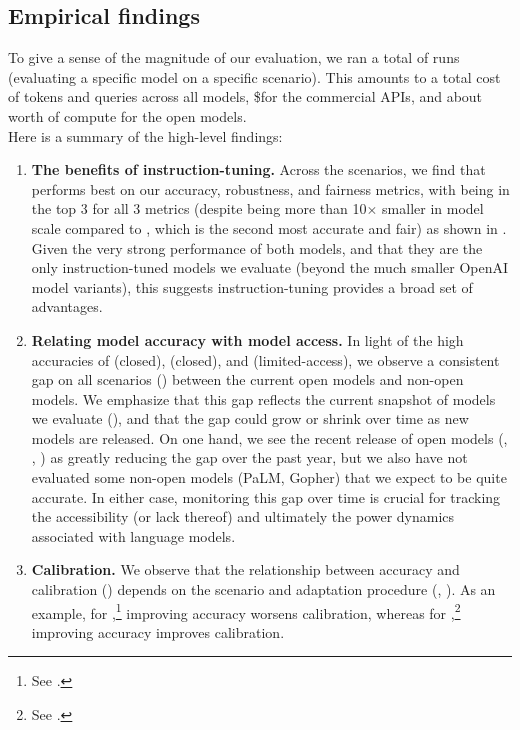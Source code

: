 \hypertarget{findings}{\subsection{Empirical findings}}
\label{sec:findings}
To give a sense of the magnitude of our evaluation, we ran a total of \numrunresults runs (\ie evaluating a specific model on a specific scenario).
This amounts to a total cost of \totaltokens tokens and 
\totalqueries queries across all models, 
\$\totaldollars for the commercial APIs, and about \totalgpuhours \gpuhours worth of compute for the open models. \\

\noindent Here is a summary of the high-level findings:
\begin{enumerate}
    \item \textbf{The benefits of instruction-tuning.}
    Across the \core scenarios, we find that \instructdavinci performs best on our accuracy, robustness, and fairness metrics, with \anthropic being in the top 3 for all 3 metrics (despite being more than 10$\times$ smaller in model scale compared to \mtnlgfivethreezero, which is the second most accurate and fair) as shown in . 
    Given the very strong performance of both models, and that they are the only instruction-tuned models we evaluate (beyond the much smaller OpenAI model variants), this suggests instruction-tuning provides a broad set of advantages.

    \item \textbf{Relating model accuracy with model access.}
    In light of the high accuracies of \anthropic (closed), \mtnlgfivethreezero (closed), and \instructdavinci (limited-access), we observe a consistent gap on all \core scenarios () between the current open models and non-open models.
    We emphasize that this gap reflects the current snapshot of models we evaluate (), and that the gap could grow or shrink over time as new models are released.
    On one hand, we see the recent release of open models (\optonesevenfive, \bloom, \glm) as greatly reducing the gap over the past year, but we also have not evaluated some non-open models (\eg PaLM, Gopher) that we expect to be quite accurate.
    In either case, monitoring this gap over time is crucial for 
    tracking the accessibility (or lack thereof) and ultimately the power dynamics associated with language models.
    
    \item \textbf{Calibration.}
    We observe that the relationship between accuracy and calibration () depends on the scenario and adaptation procedure (, ).
    As an example, for \hellaswag,\footnote{See .} improving accuracy worsens calibration,
    whereas for \openbookqa,\footnote{See .} improving accuracy improves calibration.
    

\end{enumerate}
